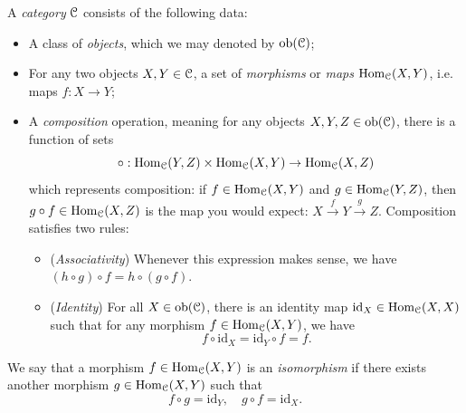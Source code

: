 \documentclass[10pt]{amsart}
\newcommand{\euscr}[1]{\EuScript{#1}}
\theoremstyle{definition}
\newcommand{\cdef}[1]{\textcolor{Bittersweet}{#1}}
\begin{document}
A \emph{\cdef{category}} $\euscr{C}$ consists of the following data:
\begin{itemize}
    \item A class of \emph{objects}, which we may denoted by $\text{ob}(\euscr{C})$;
    \item For any two objects $X, Y \in \euscr{C}$, a set of \emph{morphisms} or \emph{maps} $\text{Hom}_{\euscr{C}}(X, Y)$, i.e. maps $f:X \to Y$;
    \item A \emph{composition} operation, meaning for any objects $X, Y, Z \in \text{ob}(\euscr{C})$, there is a function of sets
    \[\circ:\text{Hom}_{\euscr{C}}(Y, Z) \times\text{Hom}_{\euscr{C}}(X, Y) \to \text{Hom}_{\euscr{C}}(X, Z)\]
    which represents composition: if $f \in \text{Hom}_{\euscr{C}}(X, Y)$ and $g \in \text{Hom}_{\euscr{C}}(Y, Z)$, then $g \circ f \in \text{Hom}_{\euscr{C}}(X, Z)$
    is the map you would expect: $X \xrightarrow{f}Y \xrightarrow{g}Z$. Composition satisfies two rules:
    \begin{itemize}
        \item (\cdef{\emph{Associativity}}) Whenever this expression makes sense, we have $(h \circ g) \circ f = h \circ (g \circ f)$.
        \item (\cdef{\emph{Identity}}) For all $X \in \text{ob}(\euscr{C})$, there is an identity map $\text{id}_X \in \text{Hom}_{\euscr{C}}(X, X)$ such that for any morphism $f \in \text{Hom}_{\euscr{C}}(X, Y)$, we have
        \[f \circ \text{id}_X = \text{id}_Y \circ f = f.\]
    \end{itemize}
\end{itemize}
We say that a morphism $f \in \text{Hom}_\euscr{C}(X, Y)$ is an \cdef{\emph{isomorphism}} if there exists another morphism $g \in \text{Hom}_{\euscr{C}}(X, Y)$ such that
\[f \circ g = \text{id}_Y, \quad g \circ f = \text{id}_X.\]
\end{document}
